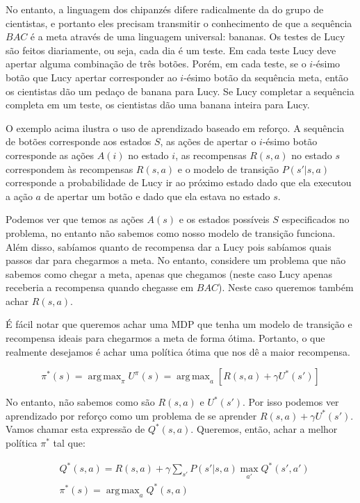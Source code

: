 \documentclass[a4paper,10pt]{article}
\DeclareMathOperator*{\argmax}{arg\,max}
\theoremstyle{plain}
\begin{document}
No entanto, a linguagem dos chipanzés difere radicalmente da do grupo de cientistas, e portanto
eles precisam transmitir o conhecimento de que a sequência $BAC$ é a meta através de uma linguagem
universal: bananas. Os testes de Lucy são feitos diariamente, ou seja, cada dia é um teste. Em cada
teste Lucy deve apertar alguma combinação de três botões. Porém, em cada teste, se o $i$-ésimo
botão que Lucy apertar corresponder ao $i$-ésimo botão da sequência meta, então os cientistas dão
um pedaço de banana para Lucy. Se Lucy completar a sequência completa em um teste, os cientistas
dão uma banana inteira para Lucy.

O exemplo acima ilustra o uso de aprendizado baseado em reforço. A sequência de botões corresponde
aos estados $S$, as ações de apertar o $i$-ésimo botão corresponde as ações $A(i)$ no estado $i$,
as recompensas $R(s,a)$ no estado $s$ correspondem às recompensas $R(s,a)$ e o modelo de transição
$P(s'|s,a)$ corresponde a probabilidade de Lucy ir ao próximo estado dado que ela executou a ação
$a$ de apertar um botão e dado que ela estava no estado $s$.

Podemos ver que temos as ações $A(s)$ e os estados possíveis $S$ especificados no problema, no
entanto não sabemos como nosso modelo de transição funciona. Além disso, sabíamos quanto de
recompensa dar a Lucy pois sabíamos quais passos dar para chegarmos a meta. No entanto, considere
um problema que não sabemos como chegar a meta, apenas que chegamos (neste caso Lucy apenas
receberia a recompensa quando chegasse em $BAC$). Neste caso queremos também achar $R(s,a)$.

É fácil notar que queremos achar uma MDP que tenha um modelo de transição e recompensa ideais para
chegarmos a meta de forma ótima. Portanto, o que realmente desejamos é achar uma política ótima que
nos dê a maior recompensa.

\begin{equation*}
  \pi^*(s) = \argmax_\pi U^\pi(s) = \argmax_a [R(s, a) + \gamma U^*(s')]
\end{equation*}

No entanto, não sabemos como são $R(s, a)$ e $U^*(s')$. Por isso podemos ver aprendizado por
reforço como um problema de se aprender $R(s, a) + \gamma U^*(s')$. Vamos chamar esta expressão
de $Q^*(s, a)$. Queremos, então, achar a melhor política $\pi^*$ tal que:

\begin{align*}
  &Q^*(s, a) = R(s, a) + \gamma \sum_{s'} P(s'|s,a) \max_{a'} Q^*(s', a') \\
  &\pi^*(s) = \argmax_a Q^*(s, a)
\end{align*}
\end{document}
